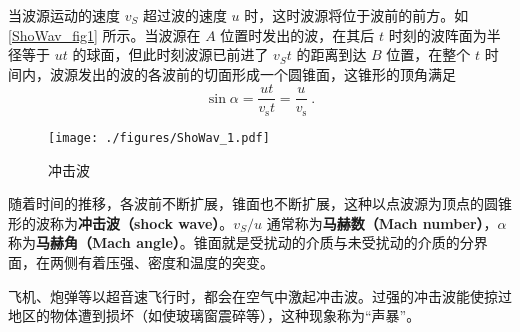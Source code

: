 
当波源运动的速度 $v_S$ 超过波的速度 $u $ 时，这时波源将位于波前的前方。如\autoref{ShoWav_fig1} 所示。当波源在 $A $ 位置时发出的波，在其后 $t $ 时刻的波阵面为半径等于 $ut $ 的球面，但此时刻波源已前进了 $v_St$ 的距离到达 $B $ 位置，在整个 $t $ 时间内，波源发出的波的各波前的切面形成一个圆锥面，这锥形的顶角满足
\begin{equation}
\sin \alpha=\frac{u t}{v_{\mathrm{s}} t}=\frac{u}{v_{\mathrm{s}}}~.
\end{equation}
\begin{figure}[ht]
\centering
\texttt{[image: ./figures/ShoWav\_1.pdf]}
\caption{冲击波} \label{ShoWav_fig1}
\end{figure}
随着时间的推移，各波前不断扩展，锥面也不断扩展，这种以点波源为顶点的圆锥形的波称为\textbf{冲击波（shock wave）}。$v_S/u$ 通常称为\textbf{马赫数（Mach number）}，$\alpha$ 称为\textbf{马赫角（Mach angle）}。锥面就是受扰动的介质与未受扰动的介质的分界面，在两侧有着压强、密度和温度的突变。

飞机、炮弹等以超音速飞行时，都会在空气中激起冲击波。过强的冲击波能使掠过地区的物体遭到损坏（如使玻璃窗震碎等），这种现象称为“声暴”。
